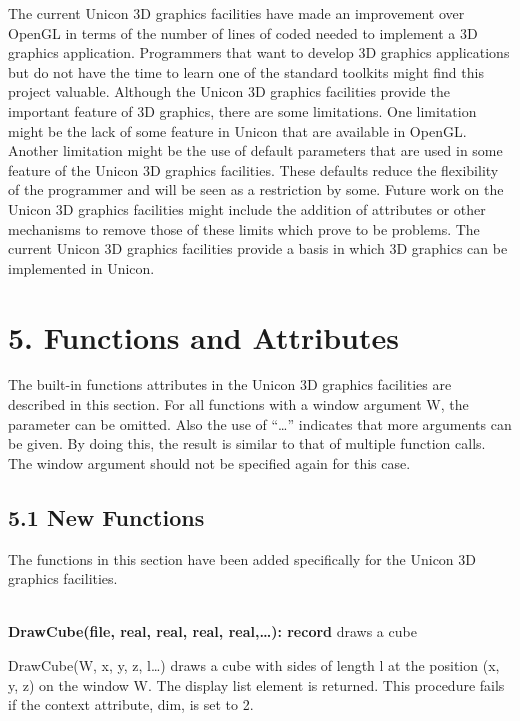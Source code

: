\documentclass[letterpaper]{article}
\begin{document}
{The current Unicon 3D graphics facilities have made an improvement
over OpenGL in terms of the number of lines of coded needed to
implement a 3D graphics application. Programmers that want to develop
3D graphics applications but do not have the time to learn one of the
standard toolkits might find this project valuable. Although the
Unicon 3D graphics facilities provide the important feature of 3D
graphics, there are some limitations. One limitation might be the lack
of some feature in Unicon that are available in OpenGL. Another
limitation might be the use of default parameters that are used in
some feature of the Unicon 3D graphics facilities. These defaults
reduce the flexibility of the programmer and will be seen as a
restriction by some. Future work on the Unicon 3D graphics facilities
might include the addition of attributes or other mechanisms to remove
those of these limits which prove to be problems. The current Unicon
3D graphics facilities provide a basis in which 3D graphics can be
implemented in Unicon.


\section[5. Functions and Attributes]{5. Functions and Attributes}

The built-in functions attributes in the Unicon 3D graphics facilities
are described in this section. For all functions with a window
argument W, the parameter can be omitted. Also the use of ``{\dots}''
indicates that more arguments can be given. By doing this, the result
is similar to that of multiple function calls. The window argument
should not be specified again for this case.

\bigskip


\subsection[5.1 New Functions]{5.1 New Functions}

The functions in this section have been added specifically for the
Unicon 3D graphics facilities.

\noindent\hrulefill\\
\noindent\textsf{\textbf{DrawCube(file, real, real, real, real,{\dots}): record}} \hfill draws a cube


\bigskip

\textsf{DrawCube(W, x, y, z, l{\dots})} draws a cube with sides of
length l at the position (x, y, z) on the window W.  The display list
element is returned. This procedure fails if the context attribute,
dim, is set to 2.


}
\end{document}
